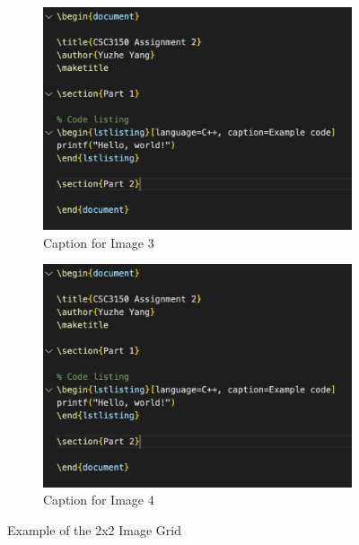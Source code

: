 \documentclass[12pt,a4paper]{report}
\begin{document}
\begin{figure}[h]
    \vspace{0.5cm} %

    \begin{subfigure}{0.4\textwidth}
        \centering
        \includegraphics[width=\textwidth]{src/example.png}
        \caption{Caption for Image 3}
    \end{subfigure}
    \hfill
    \begin{subfigure}{0.4\textwidth}
        \centering
        \includegraphics[width=\textwidth]{src/example.png}
        \caption{Caption for Image 4}
    \end{subfigure}

    \caption{Example of the 2x2 Image Grid}
\end{figure}
\newpage
\end{document}
